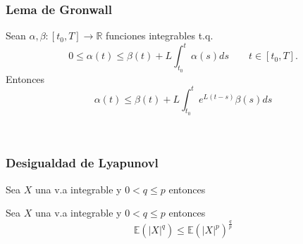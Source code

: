 \begin{frame}
  \frametitle{Lema de Gronwall}
	\hypertarget{lem:Gronwall}{}
     \begin{lema}[de Gronwall]
		Sean $\alpha,\beta:[t_0,T]\to\mathbb{R}$ funciones integrables t.q.
		$$
			0\leq \alpha(t)\leq \beta(t) +L \int_{t_0}^{t}\alpha(s)ds 
			\qquad t\in[t_0,T].
		$$
		Entonces 
		$$
			\alpha(t)\leq \beta(t)+L\int_{t_0}^{t} e^{L(t-s)}\beta(s)ds
		$$
		\end{lema}
	\hyperlink{prb:Consistencia2}{}\\
	\hyperlink{Idea}{}
\end{frame}
\begin{frame}
  \frametitle{Desigualdad de Lyapunovl}
	\hypertarget{thm:DesLyapunov}{}    
	Sea $X$ una v.a integrable y $0<q\leq p$ entonces    
    \begin{block}{Sea $X$ una v.a integrable y $0<q\leq p$ entonces}
		$$    	
    		\mathbb{E}\left(\left|X\right|^{q}\right)\leq\mathbb{E}\left(\left|X\right|^{p}\right)^{\frac{q}{p}}
		$$    
    \end{block}
	\hyperlink{prb:Consistencia3}{}
\end{frame}
